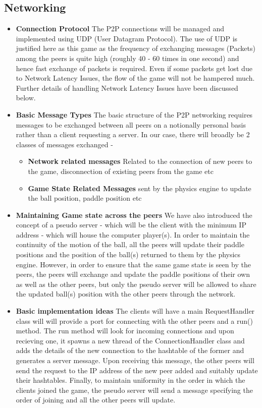 \documentclass{article}
\begin{document}
    \subsection{Networking}
    \begin{itemize}
    \item \textbf{Connection Protocol} The P2P connections will be managed and implemented using UDP (User Datagram Protocol). The use of UDP is justified here as this game as the frequency of exchanging messages (Packets) among the peers is quite high (roughly 40 - 60 times in one second) and hence fast exchange of packets is required. Even if some packets get lost due to Network Latency Issues, the flow of the game will not be hampered much. Further details of handling Network Latency Issues have been discussed below.
    
    \item \textbf{Basic Message Types} The basic structure of the P2P networking requires messages to be exchanged between all peers on a notionally personal basis rather than a client requesting a server. In our case, there will broadly be 2 classes of messages exchanged - 
    \begin{itemize}
        \item  \textbf{Network related messages} Related to the connection of new peers to the game, disconnection of existing peers from the game etc
        \item  \textbf{Game State Related Messages} sent by the physics engine to update the ball position, paddle position etc
    \end{itemize}
    
    \item  \textbf{Maintaining Game state across the peers} We have also introduced the concept of a pseudo server - which will be the client with the minimum IP address - which will house the computer player(s). In order to maintain the continuity of the motion of the ball, all the peers will update their paddle positions and the position of the ball(s) returned to them by the physics engine. However, in order to ensure that the same game state is seen by the peers, the peers will exchange and update the paddle positions of their own as well as the other peers, but only the pseudo server will be allowed to share the updated ball(s) position with the other peers through the network.

    \item  \textbf{Basic implementation ideas} The clients will have a main RequestHandler class will will provide a port for connecting with the other peers and a run() method. The run method will look for incoming connections and upon recieving one, it spawns a new thread of the ConnectionHandler class and adds the details of the new connection to the hashtable of the former and generates a server message. Upon receiving this message, the other peers will send the request to the IP address of the new peer added and suitably update their hashtables. Finally, to maintain uniformity in the order in which the clients joined the game, the pseudo server will send a message specifying the order of joining and all the other peers will update.


\end{itemize}
\end{document}
